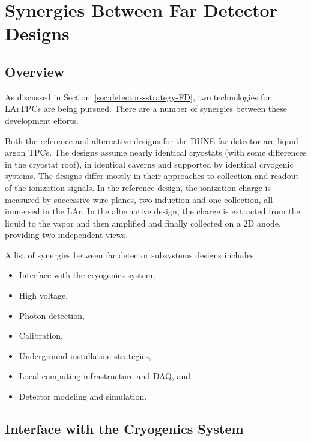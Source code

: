 \chapter{Synergies Between Far Detector Designs}
\label{ch:detectors-synergy}

\section{Overview}

As discussed in Section~\ref{sec:detectors-strategy-FD}, two
technologies for LArTPCs are being pursued. There are a number of
synergies between these development efforts.

Both the reference and alternative designs for the DUNE far detector
are liquid argon TPCs. The designs assume nearly identical cryostats
(with some differences in the cryostat roof), in identical caverns and
supported by identical cryogenic systems. The designs differ mostly in
their approaches to collection and readout of the ionization
signals. In the reference design, the ionization charge is measured by
successive wire planes, two induction and one collection, all immersed
in the LAr. In the alternative design, the charge is extracted from
the liquid to the vapor and then amplified and finally collected on a
2D anode, providing two independent views.

A list of synergies between far detector subsystems designs includes
\begin{itemize}
\item Interface with the cryogenics system,
\item High voltage, 
\item Photon detection,
\item Calibration,
\item Underground installation strategies,
\item Local computing infrastructure and DAQ, and
\item Detector modeling and simulation.
\end{itemize}

  


\section{Interface with the Cryogenics System}

